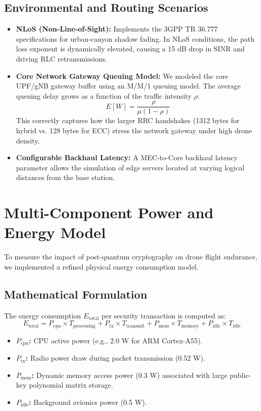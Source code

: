 \documentclass[11pt,a4paper]{article}
\begin{document}
\subsection{Environmental and Routing Scenarios}
\begin{itemize}
    \item \textbf{NLoS (Non-Line-of-Sight):} Implements the 3GPP TR 36.777 specifications for urban-canyon shadow fading. In NLoS conditions, the path loss exponent is dynamically elevated, causing a 15 dB drop in SINR and driving RLC retransmissions.
    \item \textbf{Core Network Gateway Queuing Model:} We modeled the core UPF/gNB gateway buffer using an M/M/1 queuing model. The average queuing delay grows as a function of the traffic intensity $\rho$:
    \[ E[W] = \frac{\rho}{\mu(1-\rho)} \]
    This correctly captures how the larger RRC handshakes (1312 bytes for hybrid vs. 128 bytes for ECC) stress the network gateway under high drone density.
    \item \textbf{Configurable Backhaul Latency:} A MEC-to-Core backhaul latency parameter allows the simulation of edge servers located at varying logical distances from the base station.
\end{itemize}

\hrulefill

\section{Multi-Component Power and Energy Model}

To measure the impact of post-quantum cryptography on drone flight endurance, we implemented a refined physical energy consumption model.

\subsection{Mathematical Formulation}
The energy consumption $E_{\text{total}}$ per security transaction is computed as:
\[ E_{\text{total}} = P_{\text{cpu}} \times T_{\text{processing}} + P_{\text{tx}} \times T_{\text{transmit}} + P_{\text{mem}} \times T_{\text{memory}} + P_{\text{idle}} \times T_{\text{idle}} \]
\begin{itemize}
    \item \textbf{$P_{\text{cpu}}$:} CPU active power (e.g., 2.0 W for ARM Cortex-A55).
    \item \textbf{$P_{\text{tx}}$:} Radio power draw during packet transmission (0.52 W).
    \item \textbf{$P_{\text{mem}}$:} Dynamic memory access power (0.3 W) associated with large public-key polynomial matrix storage.
    \item \textbf{$P_{\text{idle}}$:} Background avionics power (0.5 W).
\end{itemize}
\end{document}
